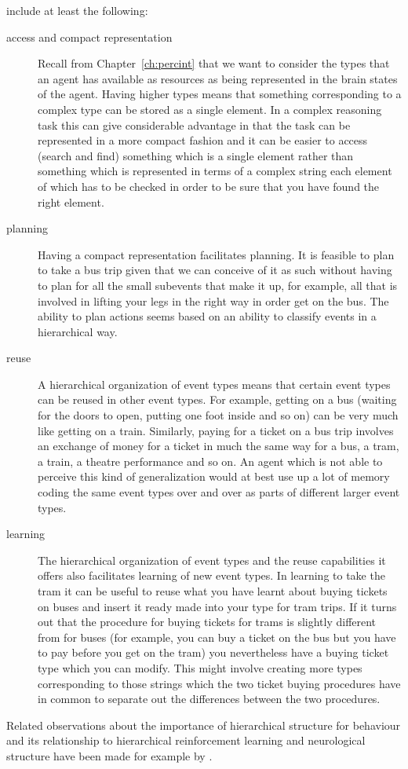 include at least the following:
\begin{description}
\item[access and compact representation] Recall from
  Chapter~\ref{ch:percint} that we want to consider the types that an
  agent has available as resources as being represented in the brain
  states of the agent.  Having higher types means
  that something corresponding to a complex type can be stored as a
  single element.  In a complex reasoning task this can give
  considerable advantage in that the task can be represented in a more
  compact fashion and it can be easier to access (search and find)
  something which is a single element rather than something which is
  represented in terms of a complex string each element of which has
  to be checked in order to be sure that you have found the right element.
\item[planning] Having a compact representation facilitates
  planning.  It is feasible to plan to take a bus trip given that we
  can conceive of it as such without having to plan for all the small
  subevents that make it up, for example, all that is involved in
  lifting your legs in the right way in order get on the bus.  The
  ability to plan actions seems based on an ability to classify events
  in a hierarchical way.
\item[reuse] A hierarchical organization of event types means that
  certain event types can be reused in other event types.  For
  example, getting on a bus (waiting for the doors to open, putting
  one foot inside and so on) can be very much like getting on a
  train.  Similarly, paying for a ticket on a bus trip involves an
  exchange of money for a ticket in much the same way for a bus, a
  tram, a train, a theatre performance and so on.  An agent which is
  not able to perceive this kind of generalization would at best use
  up a lot of memory coding the same event types over and over as
  parts of different larger event types.
\item[learning] The hierarchical organization of event types and the reuse
  capabilities it offers also facilitates learning of new event
  types.  In learning to take the tram it can be useful to reuse what
  you have learnt about buying tickets on buses and insert it ready
  made into your type for tram trips.  If it turns out that the
  procedure for buying tickets for trams is slightly different from
  for buses (for example, you can buy a ticket on the bus but you have
  to pay before you get on the tram) you nevertheless have a buying
  ticket type which you can modify.  This might involve creating more
  types corresponding to those strings which the two ticket buying
  procedures have in common to separate out the differences between
  the two procedures. 

\end{description}   
Related observations about the importance of hierarchical structure
for behaviour and its relationship to hierarchical reinforcement
learning and neurological structure have been
made for example by
\cite{Botvinick2008,BotvinickNivBarto2009,Ribas-FernandesSolwayDiukMcGuireBartoNivBotvinick2011}.

